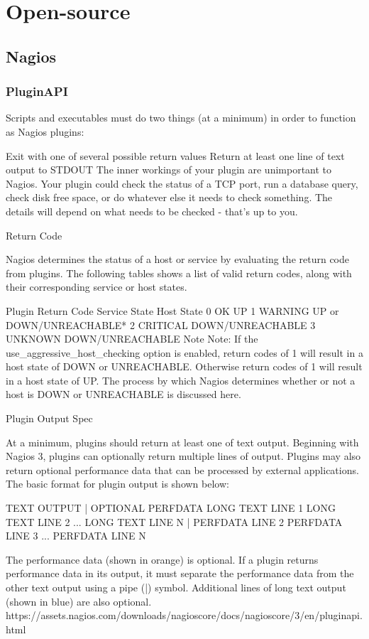 \documentclass[11pt,final,oneside]{fithesis}
\begin{document}
\section{Open-source}
\subsection{Nagios}
\subsubsection{PluginAPI}
Scripts and executables must do two things (at a minimum) in order to function as Nagios plugins:

Exit with one of several possible return values
Return at least one line of text output to STDOUT
The inner workings of your plugin are unimportant to Nagios. Your plugin could check the status of a TCP port, run a database query, check disk free space, or do whatever else it needs to check something. The details will depend on what needs to be checked - that's up to you.

Return Code

Nagios determines the status of a host or service by evaluating the return code from plugins. The following tables shows a list of valid return codes, along with their corresponding service or host states.

Plugin Return Code	Service State	Host State
0	OK	UP
1	WARNING	UP or DOWN/UNREACHABLE*
2	CRITICAL	DOWN/UNREACHABLE
3	UNKNOWN	DOWN/UNREACHABLE
Note Note: If the use_aggressive_host_checking option is enabled, return codes of 1 will result in a host state of DOWN or UNREACHABLE. Otherwise return codes of 1 will result in a host state of UP. The process by which Nagios determines whether or not a host is DOWN or UNREACHABLE is discussed here.

Plugin Output Spec

At a minimum, plugins should return at least one of text output. Beginning with Nagios 3, plugins can optionally return multiple lines of output. Plugins may also return optional performance data that can be processed by external applications. The basic format for plugin output is shown below:

TEXT OUTPUT | OPTIONAL PERFDATA
LONG TEXT LINE 1
LONG TEXT LINE 2
...
LONG TEXT LINE N | PERFDATA LINE 2
PERFDATA LINE 3
...
PERFDATA LINE N

The performance data (shown in orange) is optional. If a plugin returns performance data in its output, it must separate the performance data from the other text output using a pipe (|) symbol. Additional lines of long text output (shown in blue) are also optional.
https://assets.nagios.com/downloads/nagioscore/docs/nagioscore/3/en/pluginapi.html
\end{document}
